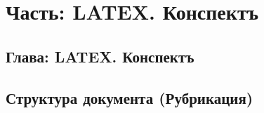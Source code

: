 \part{Часть: LATEX. Конспектъ}
\chapter{Глава: LATEX. Конспектъ}





\chapter{Структура документа (Рубрикация)}








